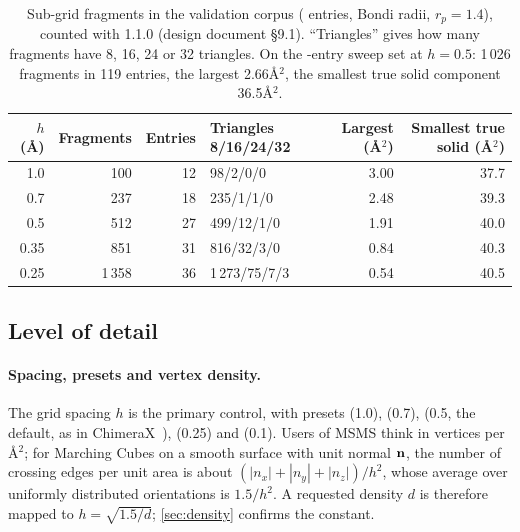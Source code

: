 \begin{table}[t]
  \centering
  \caption{Sub-grid fragments in the validation corpus
    ( entries, Bondi radii, $r_p = 1.4$\Ang), counted with
    \sesmesh{} 1.1.0 (design document \S9.1). ``Triangles'' gives how many
    fragments have 8, 16, 24 or 32 triangles. On the -entry
    sweep set at $h = 0.5$\Ang: 1\,026 fragments in 119 entries, the largest
    2.66\AA$^2$, the smallest true solid component 36.5\AA$^2$.}
  \label{tab:fragments}
  \small
  \begin{tabular}{@{}rrrlrr@{}}
    \toprule
    $h$ (\AA) & Fragments & Entries & Triangles 8/16/24/32 &
      Largest (\AA$^2$) & Smallest true solid (\AA$^2$) \\
    \midrule
    1.0  & 100   & 12 & 98/2/0/0       & 3.00 & 37.7 \\
    0.7  & 237   & 18 & 235/1/1/0      & 2.48 & 39.3 \\
    0.5  & 512   & 27 & 499/12/1/0     & 1.91 & 40.0 \\
    0.35 & 851   & 31 & 816/32/3/0     & 0.84 & 40.3 \\
    0.25 & 1\,358 & 36 & 1\,273/75/7/3 & 0.54 & 40.5 \\
    \bottomrule
  \end{tabular}
\end{table}

\subsection{Level of detail}
\label{sec:lod}

\paragraph{Spacing, presets and vertex density.}
The grid spacing $h$ is the primary control, with presets 
(1.0\Ang),  (0.7\Ang),  (0.5\Ang, the default, as in
ChimeraX~\cite{chimeraxsurface}),  (0.25\Ang) and 
(0.1\Ang). Users of MSMS think in vertices per \AA$^2$; for Marching Cubes
on a smooth surface with unit normal $\mathbf{n}$, the number of crossing
edges per unit area is about $(|n_x| + |n_y| + |n_z|)/h^2$, whose average
over uniformly distributed orientations is $1.5/h^2$. A requested density
$d$ is therefore mapped to $h = \sqrt{1.5/d}$; \cref{sec:density} confirms
the constant.

